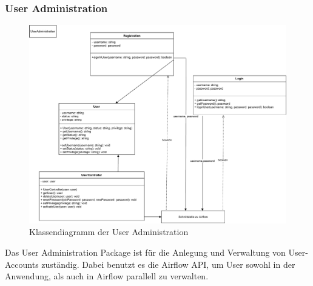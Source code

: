 \subsubsection{User Administration}
\begin{figure}[H]
    \includegraphics[width=1\textwidth]{res/UserAdministration.pdf}
    \caption{Klassendiagramm der User Administration}
\end{figure}
Das User Administration Package ist für die Anlegung und Verwaltung von User-Accounts zuständig.
Dabei benutzt es die Airflow API, um User sowohl in der Anwendung, als auch in Airflow parallell zu verwalten.

